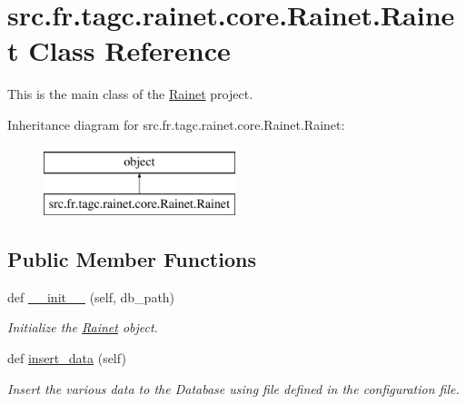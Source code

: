 \hypertarget{classsrc_1_1fr_1_1tagc_1_1rainet_1_1core_1_1Rainet_1_1Rainet}{}\section{src.\+fr.\+tagc.\+rainet.\+core.\+Rainet.\+Rainet Class Reference}
\label{classsrc_1_1fr_1_1tagc_1_1rainet_1_1core_1_1Rainet_1_1Rainet}


This is the main class of the \hyperlink{classsrc_1_1fr_1_1tagc_1_1rainet_1_1core_1_1Rainet_1_1Rainet}{Rainet} project.  


Inheritance diagram for src.\+fr.\+tagc.\+rainet.\+core.\+Rainet.\+Rainet\+:\begin{figure}[H]
\begin{center}
\leavevmode
\includegraphics[height=2.000000cm]{classsrc_1_1fr_1_1tagc_1_1rainet_1_1core_1_1Rainet_1_1Rainet}
\end{center}
\end{figure}
\subsection*{Public Member Functions}
\begin{DoxyCompactItemize}
\item 
def \hyperlink{classsrc_1_1fr_1_1tagc_1_1rainet_1_1core_1_1Rainet_1_1Rainet_a92e1698d37d733e389aea584f74885f2}{\+\_\+\+\_\+init\+\_\+\+\_\+} (self, db\+\_\+path)
\begin{DoxyCompactList}\small\item\em Initialize the \hyperlink{classsrc_1_1fr_1_1tagc_1_1rainet_1_1core_1_1Rainet_1_1Rainet}{Rainet} object. \end{DoxyCompactList}\item 
\hypertarget{classsrc_1_1fr_1_1tagc_1_1rainet_1_1core_1_1Rainet_1_1Rainet_a21be49bba245c039044a96f40dfcc5de}{}def \hyperlink{classsrc_1_1fr_1_1tagc_1_1rainet_1_1core_1_1Rainet_1_1Rainet_a21be49bba245c039044a96f40dfcc5de}{insert\+\_\+data} (self)\label{classsrc_1_1fr_1_1tagc_1_1rainet_1_1core_1_1Rainet_1_1Rainet_a21be49bba245c039044a96f40dfcc5de}

\begin{DoxyCompactList}\small\item\em Insert the various data to the Database using file defined in the configuration file. \end{DoxyCompactList}\end{DoxyCompactItemize}

